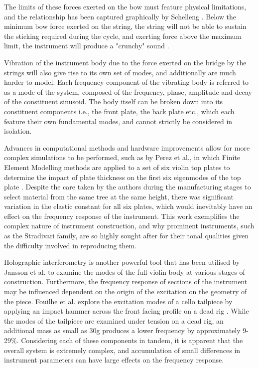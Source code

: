 The limits of these forces exerted on the bow must feature physical limitations, and the relationship has been captured graphically by Schelleng \cite{schelleng1974}. Below the minimum bow force exerted on the string, the string will not be able to sustain the sticking required during the cycle, and exerting force above the maximum limit, the instrument will produce a "crunchy" sound \cite{woodhouse1993}.

Vibration of the instrument body due to the force exerted on the bridge by the strings will also give rise to its own set of modes, and additionally are much harder to model. Each frequency component of the vibrating body is referred to as a mode of the system, composed of the frequency, phase, amplitude and decay of the constituent sinusoid. The body itself can be broken down into its constituent components i.e., the front plate, the back plate etc., which each feature their own fundamental modes, and cannot strictly be considered in isolation.

Advances in computational methods and hardware improvements allow for more complex simulations to be performed, such as by Perez et al., in which Finite Element Modelling methods are applied to a set of six violin top plates to determine the impact of plate thickness on the first six eigenmodes of the top plate \cite{perez2023}. Despite the care taken by the authors during the manufacturing stages to select material from the same tree at the same height, there was significant variation in the elastic constant for all six plates, which would inevitably have an effect on the frequency response of the instrument. This work exemplifies the complex nature of instrument construction, and why prominent instruments, such as the Stradivari family, are so highly sought after for their tonal qualities given the difficulty involved in reproducing them.

Holographic interferometry is another powerful tool that has been utilised by Jansson et al. \cite{jansson1970} to examine the modes of the full violin body at various stages of construction. Furthermore, the frequency response of sections of the instrument may be influenced dependent on the origin of the excitation on the geometry of the piece. Fouilhe et al. explore the excitation modes of a cello tailpiece by applying an impact hammer across the front facing profile on a dead rig \cite{fouilhe2011}. While the modes of the tailpiece are examined under tension on a dead rig, an additional mass as small as 30g produces a lower frequency by approximately 9-29\%. Considering each of these components in tandem, it is apparent that the overall system is extremely complex, and accumulation of small differences in instrument parameters can have large effects on the frequency response.

